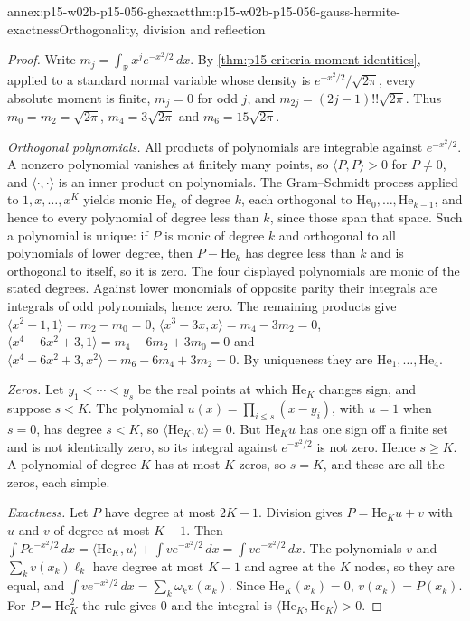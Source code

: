 \begin{annexitem}{annex:p15-w02b-p15-056-ghexact}{thm:p15-w02b-p15-056-gauss-hermite-exactness}{Orthogonality, division and reflection}
\begin{proof}
Write \(m_j=\int_{\mathbb R}x^je^{-x^2/2}\,dx\). By
\cref{thm:p15-criteria-moment-identities}, applied to a standard normal
variable whose density is \(e^{-x^2/2}/\sqrt{2\pi}\), every absolute
moment is finite, \(m_j=0\) for odd \(j\), and
\(m_{2j}=(2j-1)!!\sqrt{2\pi}\). Thus \(m_0=m_2=\sqrt{2\pi}\),
\(m_4=3\sqrt{2\pi}\) and \(m_6=15\sqrt{2\pi}\).

\emph{Orthogonal polynomials.} All products of polynomials are integrable
against \(e^{-x^2/2}\). A nonzero polynomial vanishes at finitely many
points, so \(\langle P,P\rangle>0\) for \(P\neq0\), and
\(\langle\cdot,\cdot\rangle\) is an inner product on polynomials. The
Gram--Schmidt process applied to \(1,x,\ldots,x^K\) yields monic
\(\mathrm{He}_k\) of degree \(k\), each orthogonal to
\(\mathrm{He}_0,\ldots,\mathrm{He}_{k-1}\), and hence to every polynomial
of degree less than \(k\), since those span that space. Such a polynomial
is unique: if \(P\) is monic of degree \(k\) and orthogonal to all
polynomials of lower degree, then \(P-\mathrm{He}_k\) has degree less than
\(k\) and is orthogonal to itself, so it is zero. The four displayed
polynomials are monic of the stated degrees. Against lower monomials of
opposite parity their integrals are integrals of odd polynomials, hence
zero. The remaining products give \(\langle x^2-1,1\rangle=m_2-m_0=0\),
\(\langle x^3-3x,x\rangle=m_4-3m_2=0\),
\(\langle x^4-6x^2+3,1\rangle=m_4-6m_2+3m_0=0\) and
\(\langle x^4-6x^2+3,x^2\rangle=m_6-6m_4+3m_2=0\). By uniqueness they are
\(\mathrm{He}_1,\ldots,\mathrm{He}_4\).

\emph{Zeros.} Let \(y_1<\cdots<y_s\) be the real points at which
\(\mathrm{He}_K\) changes sign, and suppose \(s<K\). The polynomial
\(u(x)=\prod_{i\leq s}(x-y_i)\), with \(u=1\) when \(s=0\), has degree
\(s<K\), so \(\langle\mathrm{He}_K,u\rangle=0\). But
\(\mathrm{He}_Ku\) has one sign off a finite set and is not identically
zero, so its integral against \(e^{-x^2/2}\) is not zero. Hence
\(s\geq K\). A polynomial of degree \(K\) has at most \(K\) zeros, so
\(s=K\), and these are all the zeros, each simple.

\emph{Exactness.} Let \(P\) have degree at most \(2K-1\). Division gives
\(P=\mathrm{He}_Ku+v\) with \(u\) and \(v\) of degree at most \(K-1\).
Then \(\int Pe^{-x^2/2}\,dx=\langle\mathrm{He}_K,u\rangle
+\int ve^{-x^2/2}\,dx=\int ve^{-x^2/2}\,dx\). The polynomials \(v\) and
\(\sum_kv(x_k)\ell_k\) have degree at most \(K-1\) and agree at the \(K\)
nodes, so they are equal, and
\(\int ve^{-x^2/2}\,dx=\sum_k\omega_kv(x_k)\). Since
\(\mathrm{He}_K(x_k)=0\), \(v(x_k)=P(x_k)\). For \(P=\mathrm{He}_K^2\) the
rule gives \(0\) and the integral is \(\langle\mathrm{He}_K,\mathrm{He}_K\rangle>0\).


\end{proof}
\end{annexitem}
